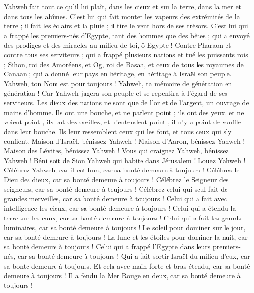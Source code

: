 \begin{multicols}{2}
Yahweh fait tout ce qu'il lui plaît, dans les cieux et sur la terre, dans la mer et dans tous les abîmes.
C'est lui qui fait monter les vapeurs des extrémités de la terre ; il fait les éclairs et la pluie ; il tire le vent hors de ses trésors.
C'est lui qui a frappé les premiers-nés d'Egypte, tant des hommes que des bêtes ;
qui a envoyé des prodiges et des miracles au milieu de toi, ô Egypte ! Contre Pharaon et contre tous ses serviteurs ;
qui a frappé plusieurs nations et tué les puissants rois ;
Sihon, roi des Amoréens, et Og, roi de Basan, et ceux de tous les royaumes de Canaan ;
qui a donné leur pays en héritage, en héritage à Israël son peuple.
Yahweh, ton Nom est pour toujours ! Yahweh, ta mémoire de génération en génération !
Car Yahweh jugera son peuple et se repentira à l'égard de ses serviteurs.
Les dieux des nations ne sont que de l'or et de l'argent, un ouvrage de mains d'homme.
Ils ont une bouche, et ne parlent point ; ils ont des yeux, et ne voient point ;
ils ont des oreilles, et n'entendent point ; il n'y a point de souffle dans leur bouche.
Ils leur ressemblent ceux qui les font, et tous ceux qui s'y confient.
Maison d'Israël, bénissez Yahweh ! Maison d'Aaron, bénissez Yahweh !
Maison des Lévites, bénissez Yahweh ! Vous qui craignez Yahweh, bénissez Yahweh !
Béni soit de Sion Yahweh qui habite dans Jérusalem ! Louez Yahweh !
\VerseOne{}Célébrez Yahweh, car il est bon, car sa bonté demeure à toujours !
Célébrez le Dieu des dieux, car sa bonté demeure à toujours !
Célébrez le Seigneur des seigneurs, car sa bonté demeure à toujours !
Célébrez celui qui seul fait de grandes merveilles, car sa bonté demeure à toujours !
Celui qui a fait avec intelligence les cieux, car sa bonté demeure à toujours !
Celui qui a étendu la terre sur les eaux, car sa bonté demeure à toujours !
Celui qui a fait les grands luminaires, car sa bonté demeure à toujours !
Le soleil pour dominer sur le jour, car sa bonté demeure à toujours !
La lune et les étoiles pour dominer la nuit, car sa bonté demeure à toujours !
Celui qui a frappé l'Egypte dans leurs premiers-nés, car sa bonté demeure à toujours !
Qui a fait sortir Israël du milieu d'eux, car sa bonté demeure à toujours.
Et cela avec main forte et bras étendu, car sa bonté demeure à toujours !
Il a fendu la Mer Rouge en deux, car sa bonté demeure à toujours !

\end{multicols}
